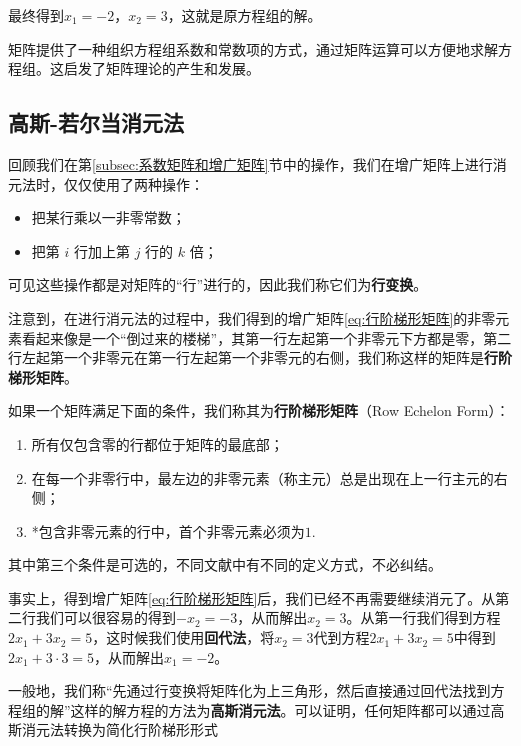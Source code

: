 \documentclass[lang=cn,newtx,10pt,scheme=chinese]{elegantbook}
\begin{document}
最终得到$x_1=-2$，$x_2=3$，这就是原方程组的解。

矩阵提供了一种组织方程组系数和常数项的方式，通过矩阵运算可以方便地求解方程组。这启发了矩阵理论的产生和发展。


\subsection{高斯-若尔当消元法}
\label{subsec:高斯-若尔当消元法}

回顾我们在第\ref{subsec:系数矩阵和增广矩阵}节中的操作，我们在增广矩阵上进行消元法时，仅仅使用了两种操作：
\begin{itemize}
    \item 把某行乘以一非零常数；
    \item 把第 $i$ 行加上第 $j$ 行的 $k$ 倍；
\end{itemize}

可见这些操作都是对矩阵的“行”进行的，因此我们称它们为\textcolor{third}{\bf 行变换}。

注意到，在进行消元法的过程中，我们得到的增广矩阵\ref{eq:行阶梯形矩阵}的非零元素看起来像是一个“倒过来的楼梯”，其第一行左起第一个非零元下方都是零，第二行左起第一个非零元在第一行左起第一个非零元的右侧，我们称这样的矩阵是\textcolor{third}{\bf 行阶梯形矩阵}。

\begin{definition}[行阶梯形矩阵]
    如果一个矩阵满足下面的条件，我们称其为{\bf 行阶梯形矩阵}（Row Echelon Form）：
    \begin{enumerate}
        \item 所有仅包含零的行都位于矩阵的最底部；
        \item 在每一个非零行中，最左边的非零元素（称主元）总是出现在上一行主元的右侧；
        \item *包含非零元素的行中，首个非零元素必须为$1$.
    \end{enumerate}
    其中第三个条件是可选的，不同文献中有不同的定义方式，不必纠结。
\end{definition}

事实上，得到增广矩阵\ref{eq:行阶梯形矩阵}后，我们已经不再需要继续消元了。从第二行我们可以很容易的得到$-x_2=-3$，从而解出$x_2=3$。从第一行我们得到方程$2x_1+3x_2=5$，这时候我们使用\textbf{回代法}，将$x_2=3$代到方程$2x_1+3x_2=5$中得到$2x_1+3\cdot 3=5$，从而解出$x_1=-2$。

一般地，我们称\textcolor{second}{“先通过行变换将矩阵化为上三角形，然后直接通过回代法找到方程组的解”}这样的解方程的方法为\textcolor{third}{\bf 高斯消元法}。可以证明，任何矩阵都可以通过高斯消元法转换为简化行阶梯形形式
\end{document}
